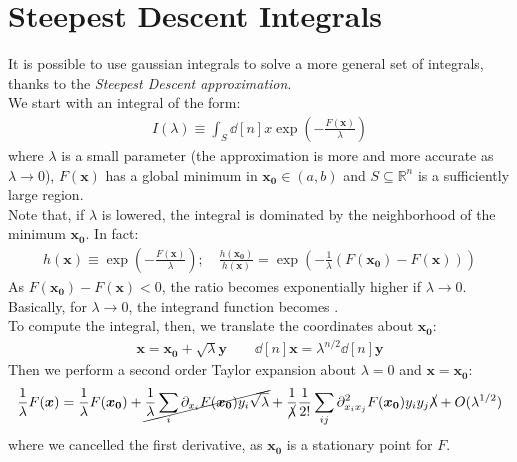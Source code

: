 \documentclass[../template.tex]{subfiles}
\begin{document}
\section{Steepest Descent Integrals}
It is possible to use gaussian integrals to solve a more general set of integrals, thanks to the \textit{Steepest Descent approximation}.\\
We start with an integral of the form:
\begin{align}\label{eqn:steepest-form}
    I(\lambda) \equiv \int_S \dd[n]{x} \exp\left(-\frac{F(\bm{x})}{\lambda} \right)
\end{align}
where $\lambda$ is a small parameter (the approximation is more and more accurate as $\lambda \to 0$), $F(\bm{x})$ has a global minimum in $\bm{x_0} \in (a,b)$ and $S \subseteq \mathbb{R}^n$ is a sufficiently large region.\\
Note that, if $\lambda$ is lowered, the integral is dominated by the neighborhood of the minimum $\bm{x_0}$. In fact:
\begin{align*}
    h(\bm{x}) \equiv \exp\left(-\frac{F(\bm{x})}{\lambda}\right); \quad \frac{h(\bm{x_0})}{h(\bm{x})} = \exp\left(-\frac{1}{\lambda}(F(\bm{x_0}) - F(\bm{x})) \right) 
\end{align*}
As $F(\bm{x_0})-F(\bm{x}) < 0$, the ratio becomes exponentially higher if $\lambda \to 0$. Basically, for $\lambda \to 0$, the integrand function becomes .\\ 

To compute the integral, then, we translate the coordinates about $\bm{x_0}$: 
\begin{align*}
    \bm{x} = \bm{x_0} + \sqrt{\lambda} \bm{y} \qquad \dd[n]{\bm{x}} = \lambda^{n/2} \dd[n]{\bm{y}}
\end{align*}
Then we perform a second order Taylor expansion about $\lambda = 0$ and $\bm{x} = \bm{x_0}$:  
\begin{align*}
    \frac{1}{\lambda}F(\bm{x}) = \frac{1}{\lambda}F(\bm{x_0}) + \cancel{\frac{1}{\lambda}\sum_i \partial_{x_i} F(\bm{x_0}) y_i \sqrt{\lambda} }+ \frac{1}{\cancel{\lambda}}\frac{1}{2!} \sum_{ij} \partial^2_{x_i x_j} F(\bm{x_0}) y_i y_j \cancel{\lambda} + O(\lambda^{1/2})     
\end{align*}    
where we cancelled the first derivative, as $\bm{x_0}$ is a stationary point for $F$.\\
\end{document}
